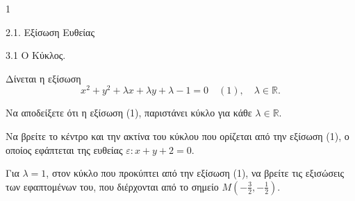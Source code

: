 \begin{ylh}{1}
    \item 2.1. Εξίσωση Ευθείας
    \item 3.1 Ο Κύκλος.
\end{ylh}
Δίνεται η εξίσωση
\[ x^2 + y^2 + \lambda x + \lambda y + \lambda - 1 = 0 \quad (1), \quad \lambda \in \mathbb{R}. \]
\begin{alist}
    \item Να αποδείξετε ότι η εξίσωση (1), παριστάνει κύκλο για κάθε $\lambda \in \mathbb{R}$. 
    \item Να βρείτε το κέντρο και την ακτίνα του κύκλου που ορίζεται από την εξίσωση (1), ο οποίος εφάπτεται της ευθείας $\varepsilon: x+y+2=0$. 
    \item Για $\lambda = 1$, στον κύκλο που προκύπτει από την εξίσωση (1), να βρείτε τις εξισώσεις των εφαπτομένων του, που διέρχονται από το σημείο $M\left(-\frac{3}{2}, -\frac{1}{2}\right)$. 
\end{alist}